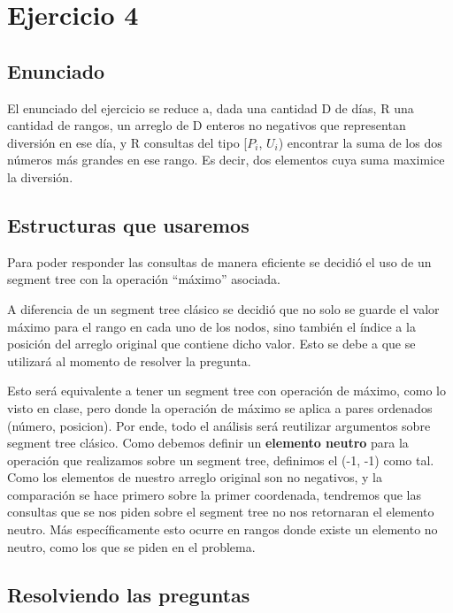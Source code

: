 \section{Ejercicio 4}
\subsection{Enunciado}
El enunciado del ejercicio se reduce a, dada una cantidad D de días, R una cantidad de rangos, un arreglo
de D enteros no negativos que representan diversión en ese día, y R consultas del tipo [$P_i$, $U_i$) encontrar
la suma de los dos números más grandes en ese rango. Es decir, dos elementos cuya suma maximice la diversión.

\subsection{Estructuras que usaremos}

Para poder responder las consultas de manera eficiente se decidió el uso de un segment tree con la operación ``máximo'' asociada.\newline

A diferencia de un segment tree clásico se decidió que no solo se guarde el valor máximo para el rango en cada uno de los nodos, sino también el índice a la posición del arreglo original que contiene dicho valor. Esto se debe a que se utilizará al momento de resolver la pregunta.  \newline

\par{
Esto será equivalente a tener un segment tree con operación de máximo, como lo visto en clase, pero donde la operación de máximo se aplica a pares ordenados (número, posicion).
Por ende, todo el análisis será reutilizar argumentos sobre segment tree clásico. 
Como debemos definir un \textbf{elemento neutro} para la operación que realizamos sobre un segment tree, definimos
el (-1, -1) como tal. Como los elementos de nuestro arreglo original son no negativos, y la comparación se hace primero sobre la primer coordenada, tendremos que las consultas que se nos piden sobre el segment tree no nos
retornaran el elemento neutro. Más específicamente esto ocurre en rangos donde existe un elemento no neutro, como los que se piden en el problema.
}

\subsection{Resolviendo las preguntas}

